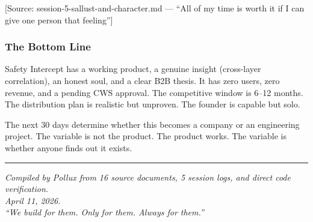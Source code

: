 \documentclass[11pt, letterpaper]{article}
\newcommand{\source}[1]{\textcolor{citation}{[Source: #1]}}
\begin{document}
  \source{session-5-sallust-and-character.md --- ``All of my time is worth it if I can give one person that feeling''}

  \subsubsection{The Bottom Line}

  Safety Intercept has a working product, a genuine insight (cross-layer correlation), an honest soul, and a clear B2B thesis. It has zero users, zero revenue, and a pending CWS approval. The competitive window is 6--12 months. The distribution plan is realistic but unproven. The founder is capable but solo.

  The next 30 days determine whether this becomes a company or an engineering project. The variable is not the product. The product works. The variable is whether anyone finds out it exists.

  \vspace{24pt}
  \hrule
  \vspace{12pt}

  \begin{center}
  \textit{Compiled by Pollux from 16 source documents, 5 session logs, and direct code verification.}\\
  \textit{April 11, 2026.}\\[6pt]
  \textit{``We build for them. Only for them. Always for them.''}
  \end{center}

  
\end{document}
